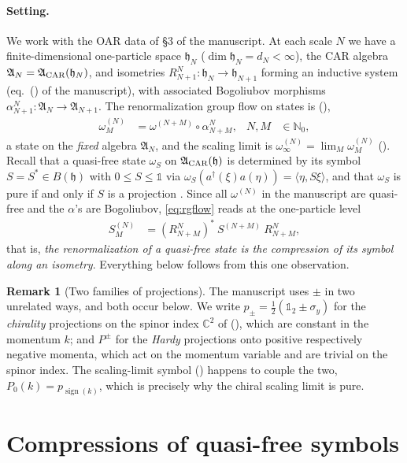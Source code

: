 \documentclass[11pt,a4paper]{article}
\theoremstyle{definition}
\newtheorem{rem}[thm]{Remark}
\newcommand{\fA}{\mathfrak{A}}
\newcommand{\fh}{\mathfrak{h}}
\newcommand{\1}{\mathds{1}}
\newcommand{\CAR}{\textup{CAR}}
\newcommand{\sign}{\operatorname{sign}}
\newcommand{\C}{\mathbb{C}}
\newcommand{\N}{\mathbb{N}}
\begin{document}
\paragraph{Setting.}
We work with the OAR data of \S3 of the manuscript. At each scale $N$ we have a finite-dimensional
one-particle space $\fh_{N}$ ($\dim\fh_{N}=d_{N}<\infty$), the CAR algebra
$\fA_{N}=\fA_{\CAR}(\fh_{N})$, and isometries $R^{N}_{N+1}:\fh_{N}\rightarrow\fh_{N+1}$ forming an
inductive system (eq.~(\mrRGiso) of the manuscript), with associated Bogoliubov morphisms
$\alpha^{N}_{N+1}:\fA_{N}\rightarrow\fA_{N+1}$. The renormalization group flow on states is (\mrRGflow),
\begin{align}
\label{eq:rgflow}
\omega^{(N)}_{M} & = \omega^{(N+M)}\circ\alpha^{N}_{N+M}, & N,M & \in\N_{0},
\end{align}
a state on the \emph{fixed} algebra $\fA_{N}$, and the scaling limit is
$\omega^{(N)}_{\infty}=\lim_{M}\omega^{(N)}_{M}$ (\mrSL). Recall that a quasi-free state $\omega_{S}$
on $\fA_{\CAR}(\fh)$ is determined by its symbol $S=S^{*}\in B(\fh)$ with $0\leq S\leq\1$ via
$\omega_{S}(a^{\dagger}(\xi)a(\eta))=\langle\eta,S\xi\rangle$, and that $\omega_{S}$ is pure if and
only if $S$ is a projection \cite{Araki,EvansKawahigashi}. Since all $\omega^{(N)}$ in the manuscript
are quasi-free and the $\alpha$'s are Bogoliubov, \eqref{eq:rgflow} reads at the one-particle level
\begin{align}
\label{eq:symbolflow}
S^{(N)}_{M} & = (R^{N}_{N+M})^{*}\!\ S^{(N+M)}\!\ R^{N}_{N+M},
\end{align}
that is, \emph{the renormalization of a quasi-free state is the compression of its symbol along an
isometry}. Everything below follows from this one observation.

\begin{rem}[Two families of projections]
\label{rem:notation}
The manuscript uses $\pm$ in two unrelated ways, and both occur below. We write $p_{\pm}=\tfrac{1}{2}(\1_{2}\pm\sigma_{y})$ for the \emph{chirality} projections on the spinor index $\C^{2}$ of (\mrChiral), which are constant in the momentum $k$; and $P^{\pm}$ for the \emph{Hardy} projections onto positive respectively negative momenta, which act on the momentum variable and are trivial on the spinor index. The scaling-limit symbol (\mrHardy) happens to couple the two, $P_{0}(k)=p_{\sign(k)}$, which is precisely why the chiral scaling limit is pure.
\end{rem}

\section{Compressions of quasi-free symbols}
\label{sec:compression}
\end{document}

